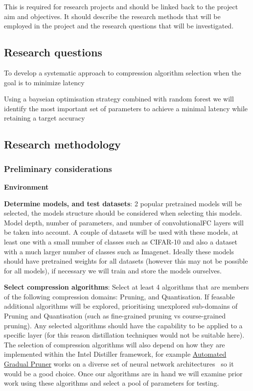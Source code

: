 \documentclass[../../D1.tex]{subfiles}
\begin{document}
This is required for research projects and should be linked
back to the project aim and objectives. It should describe the research methods that
will be employed in the project and the research questions that will be investigated.

\subsection{Research questions}


To develop a systematic approach to compression algorithm selection when the goal is to minimize latency

Using a bayseian optimisation strategy combined with random forest we will identify the most important set of parameters to achieve a minimal latency while retaining a target accuracy 

\subsection{Research methodology}

\subsubsection{Preliminary considerations}
\textbf{Environment}

\textbf{Determine models, and test datasets}: 2 popular pretrained models will be selected, the models structure should be considered when selecting this models. Model depth, number of parameters, and number of convolutional\/FC layers will be taken into account. A couple of datasets will be used with these models, at least one with a small number of classes such as CIFAR-10 and also a dataset with a much larger number of classes such as Imagenet. Ideally these models should have pretrained weights for all datasets (however this may not be possible for all models), if necessary we will train and store the models ourselves.

\textbf{Select compression algorithms}: Select at least 4 algorithms that are members of the following compression domains: Pruning, and Quantisation. If feasable additional algorithms will be explored, prioritising unexplored sub-domains of Pruning and Quantisation (such as fine-grained pruning vs course-grained pruning). Any selected algorithms should have the capability to be applied to a specific layer (for this reason distillation techniques would not be suitable here).
The selection of compression algorithms will also depend on how they are implemented within the Intel Distiller framework, for example \href{https://github.com/IntelLabs/distiller/blob/master/distiller/pruning/automated_gradual_pruner.py}{Automated Gradual Pruner} works on a diverse set of neural network architectures~\autocite{zhuPruneNotPrune2017} so it would be a good choice.
Once our algorithms are in hand we will examine prior work using these algorithms and select a pool of parameters for testing.
\end{document}
